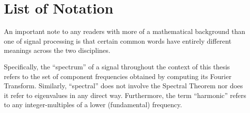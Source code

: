\documentclass[11pt,twoside]{report}
\numberwithin{thm}{section}
\numberwithin{equation}{section}
\begin{document}



\tableofcontents



\listoffigures



\chapter*{List of Notation}
An important note to any readers with more of a mathematical background than one of signal processing is that certain common words have entirely different meanings across the two disciplines.

Specifically, the ``spectrum'' of a signal throughout the context of this thesis refers to the set of component frequencies obtained by computing its Fourier Transform. Similarly, ``spectral'' does not involve the Spectral Theorem nor does it refer to eigenvalues in any direct way. Furthermore, the term ``harmonic'' 
 refers to any integer-multiples of a lower (fundamental) frequency. 
\end{document}

